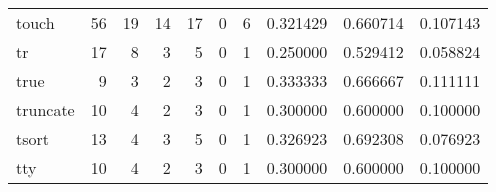\begin{tabular}{lrrrrrrrrr}
touch     &                                      56 &                                                 19 &                                                 14 &                                                 17 &                                                  0 &                                                  6 &                                           0.321429 &                               0.660714 &                             0.107143 \\
tr        &                                      17 &                                                  8 &                                                  3 &                                                  5 &                                                  0 &                                                  1 &                                           0.250000 &                               0.529412 &                             0.058824 \\
true      &                                       9 &                                                  3 &                                                  2 &                                                  3 &                                                  0 &                                                  1 &                                           0.333333 &                               0.666667 &                             0.111111 \\
truncate  &                                      10 &                                                  4 &                                                  2 &                                                  3 &                                                  0 &                                                  1 &                                           0.300000 &                               0.600000 &                             0.100000 \\
tsort     &                                      13 &                                                  4 &                                                  3 &                                                  5 &                                                  0 &                                                  1 &                                           0.326923 &                               0.692308 &                             0.076923 \\
tty       &                                      10 &                                                  4 &                                                  2 &                                                  3 &                                                  0 &                                                  1 &                                           0.300000 &                               0.600000 &                             0.100000 \\

\end{tabular}
